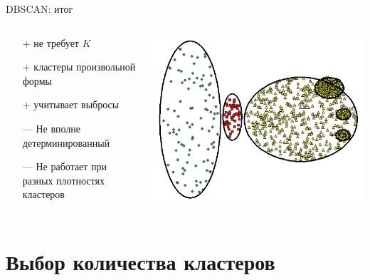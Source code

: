 \documentclass[10pt]{beamer}
\begin{document}
\begin{frame}{DBSCAN: итог}

\begin{columns}[C]
    \begin{column}{.6\textwidth} 
    \begin{itemize}
	\item[+] не требует $K$
	\item[+] кластеры произвольной формы
	\item[+] учитывает выбросы
	\item[---] Не вполне детерминированный
	\item[---] Не работает при разных плотностях кластеров
	\end{itemize}		    
    \end{column}
    \begin{column}{.4\textwidth}
    \vspace{1em}
    \includegraphics[scale=0.25]{images/dbprob.png}    
    \end{column}
\end{columns}

\end{frame}


\section{Выбор количества кластеров}

\end{document}
